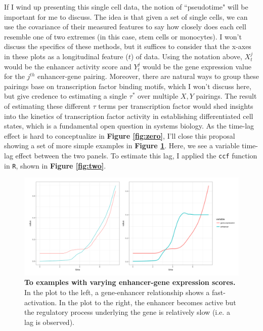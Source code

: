\documentclass{article}\usepackage[]{graphicx}\usepackage[]{color}
\begin{document}
\noindent If I wind up presenting this single cell data, the notion of ``pseudotime" will be important for me to discuss. The idea is that given a set of single cells, we can use the covariance of their measured features to say how closely does each cell resemble one of two extremes (in this case, stem cells or monocytes). I won't discuss the specifics of these methods, but it suffices to consider that the x-axes in these plots as a longitudinal feature ($t$) of data. Using the notation above, $X_{t}^j$ would be the enhancer activity score and $Y_{t}^j$ would be the gene expression value for the $j^{th}$ enhancer-gene pairing. Moreover, there are natural ways to group these pairings base on transcription factor binding motifs, which I won't discuss here, but give credence to estimating a single $\tau^*$ over multiple $X,Y$ pairings. The result of estimating these different $\tau$ terms per transcription factor would shed insights into the kinetics of transcription factor activity in establishing differentiated cell states, which is a fundamental open question in systems biology. \newline \newline As the time-lag effect is hard to conceptualize in \textbf{Figure \ref{fig:zero}}, I'll close this proposal showing a set of more simple examples in \textbf{Figure \ref{fig:one}}. Here, we see a variable time-lag effect between the two panels. To estimate this lag, I applied the \texttt{ccf} function in \texttt{R}, shown in \textbf{Figure \ref{fig:two}}. \newline

\begin{figure}[ht]
    \centering
    \includegraphics[width=\textwidth]{one.png}
    \caption{\textbf{To examples with varying enhancer-gene expression scores.} In the plot to the left, a gene-enhancer relationship shows a fast-activation. In the plot to the right, the enhancer becomes active but the regulatory process underlying the gene is relatively slow (i.e. a lag is observed).}
    \label{fig:one}
\end{figure}
\end{document}
